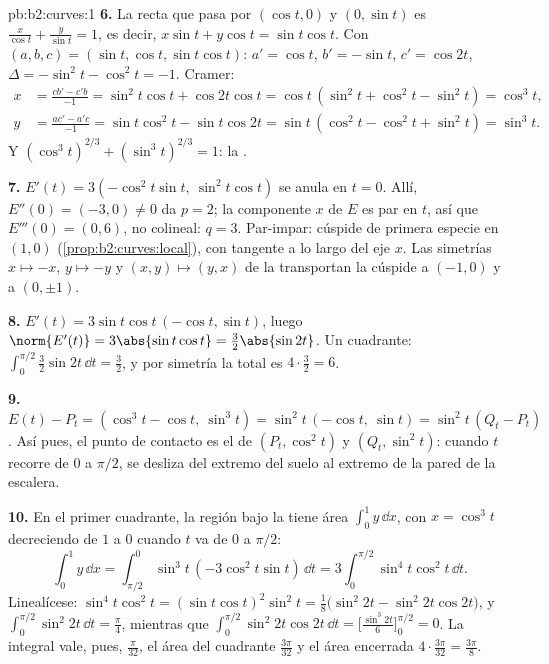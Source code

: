 \begin{solution}{pb:b2:curves:1}
\textbf{6.} La recta que pasa por $(\cos t, 0)$ y $(0, \sin t)$ es
$\frac x{\cos t} + \frac y{\sin t} = 1$, es decir, $x\sin t + y\cos t
= \sin t\cos t$. Con $(a, b, c) = (\sin t, \cos t, \sin t\cos t)$:
$a' = \cos t$, $b' = -\sin t$, $c' = \cos 2t$, $\Delta = -\sin^2 t -
\cos^2 t = -1$. Cramer:
\begin{align*}
x &= \frac{cb' - c'b}{-1} = \sin^2 t\cos t + \cos 2t\cos t
= \cos t\,(\sin^2 t + \cos^2 t - \sin^2 t) = \cos^3 t,\\
y &= \frac{ac' - a'c}{-1} = \sin t\cos^2 t - \sin t\cos 2t
= \sin t\,(\cos^2 t - \cos^2 t + \sin^2 t) = \sin^3 t .
\end{align*}
Y $(\cos^3t)^{2/3} + (\sin^3t)^{2/3} = 1$: la .

\textbf{7.} $E'(t) = 3(-\cos^2 t\sin t,\ \sin^2 t\cos t)$ se anula en
$t = 0$. Allí, $E''(0) = (-3, 0) \neq 0$ da $p = 2$; la componente
$x$ de $E$ es par en $t$, así que $E'''(0) = (0, 6)$, no colineal: $q
= 3$. Par-impar: cúspide de primera especie en $(1, 0)$
(\cref{prop:b2:curves:local}), con tangente a lo largo del eje $x$.
Las simetrías $x \mapsto -x$, $y \mapsto -y$ y $(x, y) \mapsto (y,
x)$ de la  transportan la cúspide a $(-1, 0)$ y a $(0,
\pm1)$.

\textbf{8.} $E'(t) = 3\sin t\cos t\,(-\cos t, \sin t)$, luego
$\norm{E'(t)} = 3\abs{\sin t\cos t} = \tfrac32\abs{\sin 2t}$. Un
cuadrante: $\int_0^{\pi/2}\tfrac32\sin 2t\,\dd t = \tfrac32$, y por
simetría la  total es $4 \cdot \tfrac32 = 6$.

\textbf{9.} $E(t) - P_t = (\cos^3 t - \cos t,\ \sin^3 t) = \sin^2
t\,(-\cos t,\ \sin t) = \sin^2 t\,(Q_t - P_t)$. Así pues, el punto de
contacto es el  de $(P_t, \cos^2 t)$ y $(Q_t, \sin^2 t)$:
cuando $t$ recorre de $0$ a $\pi/2$, se desliza del extremo del suelo
al extremo de la pared de la escalera.

\textbf{10.} En el primer cuadrante, la región bajo la  tiene
área $\int_0^1 y\,\dd x$, con $x = \cos^3 t$ decreciendo de $1$ a $0$
cuando $t$ va de $0$ a $\pi/2$:
\[
\int_0^1 y\,\dd x
= \int_{\pi/2}^{0}\sin^3 t\,(-3\cos^2 t\sin t)\,\dd t
= 3\int_0^{\pi/2}\sin^4 t\cos^2 t\,\dd t .
\]
Linealícese: $\sin^4 t\cos^2 t = (\sin t\cos t)^2\sin^2 t =
\tfrac18\bigl(\sin^2 2t - \sin^2 2t\cos 2t\bigr)$, y
$\int_0^{\pi/2}\sin^2 2t\,\dd t = \tfrac\pi4$, mientras que
$\int_0^{\pi/2}\sin^2 2t\cos 2t\,\dd t = \bigl[\tfrac{\sin^3
2t}6\bigr]_0^{\pi/2} = 0$. La integral vale, pues, $\tfrac\pi{32}$,
el área del cuadrante $\tfrac{3\pi}{32}$ y el área encerrada $4 \cdot
\tfrac{3\pi}{32} = \tfrac{3\pi}8$.


\end{solution}
